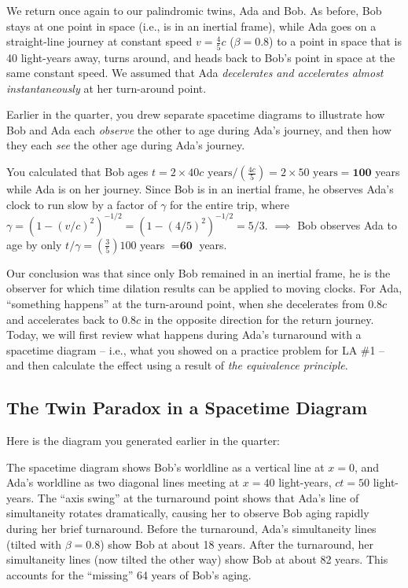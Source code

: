 \documentclass[11pt, letterpaper, openany]{book}
\begin{document}
We return once again to our palindromic twins, Ada and Bob. As before, Bob stays at one point in space (i.e., is in an inertial frame), while Ada goes on a straight-line journey at constant speed $v = \frac{4}{5}c$ ($\beta = 0.8$) to a point in space that is 40 light-years away, turns around, and heads back to Bob's point in space at the same constant speed. We assumed that Ada \textit{decelerates and accelerates almost instantaneously} at her turn-around point.

Earlier in the quarter, you drew separate spacetime diagrams to illustrate how Bob and Ada each \textit{observe} the other to age during Ada's journey, and then how they each \textit{see} the other age during Ada's journey.

You calculated that Bob ages $t = 2 \times 40c \text{ years} / (\frac{4c}{5}) = 2 \times 50 \text{ years} = \textbf{100}$ years while Ada is on her journey. Since Bob is in an inertial frame, he observes Ada's clock to run slow by a factor of $\gamma$ for the entire trip, where $\gamma = (1 - (v/c)^2)^{-1/2} = (1 - (4/5)^2)^{-1/2} = 5/3$. $\implies$ Bob observes Ada to age by only $t/\gamma = (\frac{3}{5})100$ years $= \textbf{60}$ years.

Our conclusion was that since only Bob remained in an inertial frame, he is the observer for which time dilation results can be applied to moving clocks. For Ada, ``something happens'' at the turn-around point, when she decelerates from $0.8c$ and accelerates back to $0.8c$ in the opposite direction for the return journey. Today, we will first review what happens during Ada's turnaround with a spacetime diagram -- i.e., what you showed on a practice problem for LA \#1 -- and then calculate the effect using a result of \textit{the equivalence principle}.

\subsection*{The Twin Paradox in a Spacetime Diagram}

Here is the diagram you generated earlier in the quarter:

The spacetime diagram shows Bob's worldline as a vertical line at $x = 0$, and Ada's worldline as two diagonal lines meeting at $x = 40$ light-years, $ct = 50$ light-years. The ``axis swing'' at the turnaround point shows that Ada's line of simultaneity rotates dramatically, causing her to observe Bob aging rapidly during her brief turnaround. Before the turnaround, Ada's simultaneity lines (tilted with $\beta = 0.8$) show Bob at about 18 years. After the turnaround, her simultaneity lines (now tilted the other way) show Bob at about 82 years. This accounts for the ``missing'' 64 years of Bob's aging.
\end{document}
